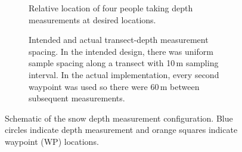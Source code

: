 \documentclass{sfuthesis}
\begin{document}
\begin{figure}[H]
    \centering
    \begin{subfigure}[b]{0.8\textwidth}
        \caption{Relative location of four people taking depth measurements at desired locations.}
        \label{probing:people}
    \end{subfigure}
    
    \begin{subfigure}[b]{0.8\textwidth}
        \caption[Intended and actual transect-depth measurement spacing]{Intended and actual transect-depth measurement spacing. In the intended design, there was uniform sample spacing along a transect with 10\,m sampling interval. In the actual implementation, every second waypoint was used so there were 60\,m between subsequent measurements.}
        \label{probing:mapview}
    \end{subfigure}

    \caption[Schematic of the snow depth measurement configuration]{Schematic of the snow depth measurement configuration. Blue circles indicate depth measurement and orange squares indicate waypoint (WP) locations.}\label{probing}
\end{figure}
\end{document}

